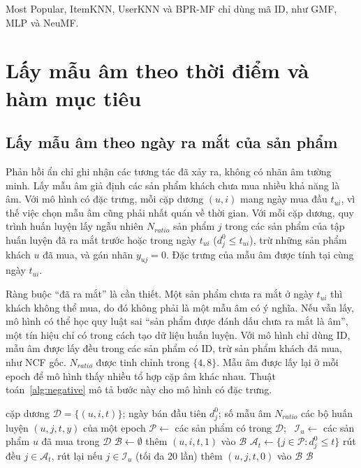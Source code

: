 Most Popular, ItemKNN, UserKNN và BPR-MF chỉ dùng mã ID, như GMF, MLP và NeuMF.

\section{Lấy mẫu âm theo thời điểm và hàm mục tiêu}
\label{sec:sampling_loss}

\subsection{Lấy mẫu âm theo ngày ra mắt của sản phẩm}
\label{subsec:dynamic_sampling}

Phản hồi ẩn chỉ ghi nhận các tương tác đã xảy ra, không có nhãn âm tường minh. Lấy mẫu âm giả định các sản phẩm khách chưa mua nhiều khả năng là âm. Với mô hình có đặc trưng, mỗi cặp dương $(u, i)$ mang ngày mua đầu $t_{ui}$, vì thế việc chọn mẫu âm cũng phải nhất quán về thời gian. Với mỗi cặp dương, quy trình huấn luyện lấy ngẫu nhiên $N_{ratio}$ sản phẩm $j$ trong các sản phẩm của tập huấn luyện đã ra mắt trước hoặc trong ngày $t_{ui}$ ($d^0_j \le t_{ui}$), trừ những sản phẩm khách $u$ đã mua, và gán nhãn $y_{uj} = 0$. Đặc trưng của mẫu âm được tính tại cùng ngày $t_{ui}$.

Ràng buộc ``đã ra mắt'' là cần thiết. Một sản phẩm chưa ra mắt ở ngày $t_{ui}$ thì khách không thể mua, do đó không phải là một mẫu âm có ý nghĩa. Nếu vẫn lấy, mô hình có thể học quy luật sai ``sản phẩm được đánh dấu chưa ra mắt là âm'', một tín hiệu chỉ có trong cách tạo dữ liệu huấn luyện. Với mô hình chỉ dùng ID, mẫu âm được lấy đều trong các sản phẩm có ID, trừ sản phẩm khách đã mua, như NCF gốc. $N_{ratio}$ được tinh chỉnh trong $\{4, 8\}$. Mẫu âm được lấy lại ở mỗi epoch để mô hình thấy nhiều tổ hợp cặp âm khác nhau. Thuật toán~\ref{alg:negative} mô tả bước này cho mô hình có đặc trưng.

\begin{algorithm}[H]
\caption{Lấy mẫu âm theo thời điểm}
\label{alg:negative}
\begin{algorithmic}[1]
\Require cặp dương $\mathcal{D} = \{(u, i, t)\}$; ngày bán đầu tiên $d^0_j$; số mẫu âm $N_{ratio}$
\Ensure các bộ huấn luyện $(u, j, t, y)$ của một epoch
\State $\mathcal{P} \gets$ các sản phẩm có trong $\mathcal{D}$; \ $\mathcal{I}_u \gets$ các sản phẩm $u$ đã mua trong $\mathcal{D}$
\State $\mathcal{B} \gets \emptyset$
    \State thêm $(u, i, t, 1)$ vào $\mathcal{B}$
    \State $\mathcal{A}_t \gets \{j \in \mathcal{P} : d^0_j \le t\}$ 
        \State rút đều $j \in \mathcal{A}_t$, rút lại nếu $j \in \mathcal{I}_u$ (tối đa 20 lần)
        \State thêm $(u, j, t, 0)$ vào $\mathcal{B}$ 
    \EndFor
\EndFor
\State \Return $\mathcal{B}$
\end{algorithmic}
\end{algorithm}

